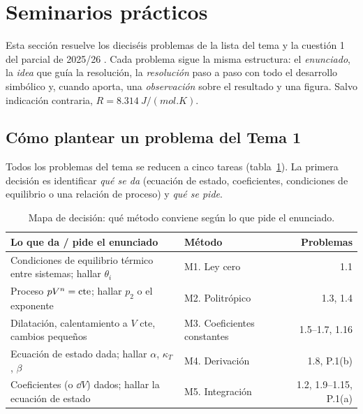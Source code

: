 \section{Seminarios prácticos}
Esta sección resuelve los dieciséis problemas de la lista del tema \cite{gonzalez1} y la cuestión 1 del
parcial de 2025/26 \cite{parcial}. Cada problema sigue la misma estructura: el \emph{enunciado}, la
\emph{idea} que guía la resolución, la \emph{resolución} paso a paso con todo el desarrollo simbólico
y, cuando aporta, una \emph{observación} sobre el resultado y una figura. Salvo indicación contraria,
$R=\SI{8,314}{J/(mol.K)}$.

\subsection{Cómo plantear un problema del Tema 1}

Todos los problemas del tema se reducen a cinco tareas (tabla~\ref{tab:metodos}). La primera decisión
es identificar \emph{qué se da} (ecuación de estado, coeficientes, condiciones de equilibrio o una
relación de proceso) y \emph{qué se pide}.

\begin{table}[htbp]
\centering
\caption{Mapa de decisión: qué método conviene según lo que pide el enunciado.}
\label{tab:metodos}
\small
\begin{tabularx}{\textwidth}{Xlr}
\toprule
Lo que da / pide el enunciado & Método & Problemas\\
\midrule
Condiciones de equilibrio térmico entre sistemas; hallar $\theta_i$ & M1. Ley cero & 1.1\\
Proceso $pV^n=\mathrm{cte}$; hallar $p_2$ o el exponente & M2. Politrópico & 1.3, 1.4\\
Dilatación, calentamiento a $V$ cte, cambios pequeños & M3. Coeficientes constantes & 1.5--1.7, 1.16\\
Ecuación de estado dada; hallar $\alpha$, $\kappa_T$, $\beta$ & M4. Derivación & 1.8, P.1(b)\\
Coeficientes (o $\dd V$) dados; hallar la ecuación de estado & M5. Integración & 1.2, 1.9--1.15, P.1(a)\\
\bottomrule
\end{tabularx}
\end{table}

